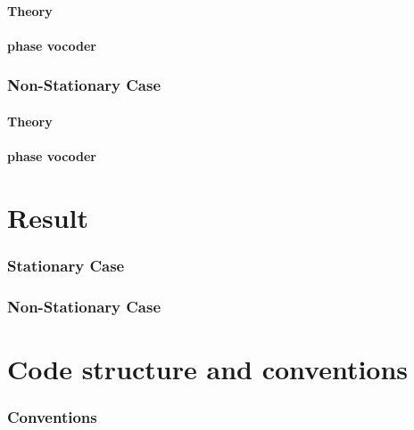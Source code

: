 \documentclass[]{article}
\begin{document}
\subsection{Theory}\label{theory-quasi-stat}
\subsection{phase vocoder}\label{phase-vocoder-quasi-stationary}
\section{Non-Stationary Case}\label{non-stationary-case}
\subsection{Theory}\label{theory-non-stat}
\subsection{phase vocoder}\label{phase-vocoder-stationary}

\newpage
\part{Result}
\section{Stationary Case}\label{sec:stationary-results}
\section{Non-Stationary Case}\label{non-stationary-results}

\newpage
\part{Code structure and conventions}\label{sec:code-structure-and-conventions}

\section{Conventions}\label{sec:conventions}
\end{document}
